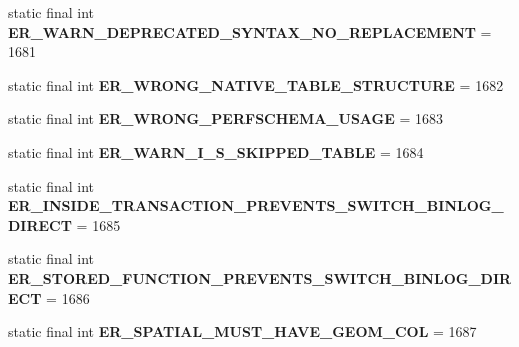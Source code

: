 \begin{DoxyCompactItemize}
static final int {\bfseries E\+R\+\_\+\+W\+A\+R\+N\+\_\+\+D\+E\+P\+R\+E\+C\+A\+T\+E\+D\+\_\+\+S\+Y\+N\+T\+A\+X\+\_\+\+N\+O\+\_\+\+R\+E\+P\+L\+A\+C\+E\+M\+E\+NT} = 1681
\item 
\mbox{\label{classcom_1_1mysql_1_1jdbc_1_1_mysql_error_numbers_a20b63e7a4b99df7ba8c39a0c3ea259b9}} 
static final int {\bfseries E\+R\+\_\+\+W\+R\+O\+N\+G\+\_\+\+N\+A\+T\+I\+V\+E\+\_\+\+T\+A\+B\+L\+E\+\_\+\+S\+T\+R\+U\+C\+T\+U\+RE} = 1682
\item 
\mbox{\label{classcom_1_1mysql_1_1jdbc_1_1_mysql_error_numbers_a2e3202f054a2b88d10332f8a74739ac4}} 
static final int {\bfseries E\+R\+\_\+\+W\+R\+O\+N\+G\+\_\+\+P\+E\+R\+F\+S\+C\+H\+E\+M\+A\+\_\+\+U\+S\+A\+GE} = 1683
\item 
\mbox{\label{classcom_1_1mysql_1_1jdbc_1_1_mysql_error_numbers_af21b618c693b1da9114102d14ff9a125}} 
static final int {\bfseries E\+R\+\_\+\+W\+A\+R\+N\+\_\+\+I\+\_\+\+S\+\_\+\+S\+K\+I\+P\+P\+E\+D\+\_\+\+T\+A\+B\+LE} = 1684
\item 
\mbox{\label{classcom_1_1mysql_1_1jdbc_1_1_mysql_error_numbers_a80feaaf27d7143cf03086a1b952a096c}} 
static final int {\bfseries E\+R\+\_\+\+I\+N\+S\+I\+D\+E\+\_\+\+T\+R\+A\+N\+S\+A\+C\+T\+I\+O\+N\+\_\+\+P\+R\+E\+V\+E\+N\+T\+S\+\_\+\+S\+W\+I\+T\+C\+H\+\_\+\+B\+I\+N\+L\+O\+G\+\_\+\+D\+I\+R\+E\+CT} = 1685
\item 
\mbox{\label{classcom_1_1mysql_1_1jdbc_1_1_mysql_error_numbers_a5062b724d2ccb9b154e12e1bb0204ac6}} 
static final int {\bfseries E\+R\+\_\+\+S\+T\+O\+R\+E\+D\+\_\+\+F\+U\+N\+C\+T\+I\+O\+N\+\_\+\+P\+R\+E\+V\+E\+N\+T\+S\+\_\+\+S\+W\+I\+T\+C\+H\+\_\+\+B\+I\+N\+L\+O\+G\+\_\+\+D\+I\+R\+E\+CT} = 1686
\item 
\mbox{\label{classcom_1_1mysql_1_1jdbc_1_1_mysql_error_numbers_aa2657180ab001630f186f045c950beed}} 
static final int {\bfseries E\+R\+\_\+\+S\+P\+A\+T\+I\+A\+L\+\_\+\+M\+U\+S\+T\+\_\+\+H\+A\+V\+E\+\_\+\+G\+E\+O\+M\+\_\+\+C\+OL} = 1687
\item 
\mbox{\label{classcom_1_1mysql_1_1jdbc_1_1_mysql_error_numbers_a5064a7d3eb6cbc6b75494c3a77ddc15c}} 

\end{DoxyCompactItemize}
